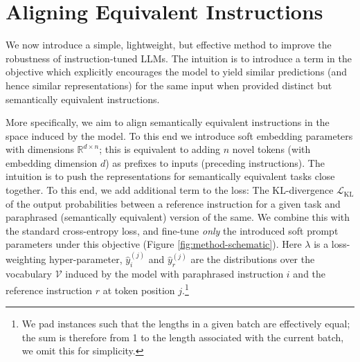 \section{Aligning Equivalent Instructions}
\vspace{-0.5em}
\label{section:methods}

We now introduce a simple, lightweight, but effective method to improve the robustness of instruction-tuned LLMs.
The intuition is to introduce a term in the objective which explicitly encourages the model to yield similar predictions (and hence similar representations) for the same input when provided distinct but semantically equivalent instructions.



More specifically, we aim to align semantically equivalent instructions in the space induced by the model.
To this end we introduce soft embedding parameters with dimensions $\mathbb{R}^{d \times n}$; this is equivalent to adding $n$ novel tokens (with embedding dimension $d$) as prefixes to inputs (preceding instructions).
The intuition is to push the representations for semantically equivalent tasks close together.
To this end, we add additional term to the loss: The KL-divergence $\mathcal{L}_{\text{KL}}$ of the output probabilities between a reference instruction for a given task and paraphrased (semantically equivalent) version of the same.
We combine this with the standard cross-entropy loss, and fine-tune \emph{only} the introduced soft prompt parameters under this objective (Figure \ref{fig:method-schematic}).
Here $\lambda$ is a loss-weighting hyper-parameter, $\hat{y}^{(j)}_i$ and $\hat{y}_r^{(j)}$ are the distributions over the vocabulary $\mathcal{V}$ induced by the model with paraphrased instruction $i$ and the reference instruction $r$ at token position $j$.\footnote{We pad instances such that the lengths in a given batch are effectively equal; the sum is therefore from 1 to the length associated with the current batch, we omit this for simplicity.}


